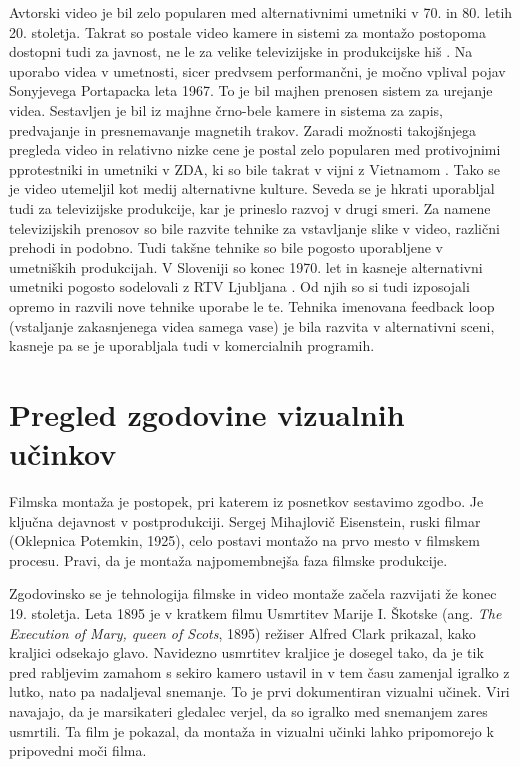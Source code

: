 \documentclass[a4paper, 12pt]{book}
\begin{document}
Avtorski video je bil zelo popularen med alternativnimi umetniki v 70. in 80. letih 20. stoletja.
Takrat so postale video kamere in sistemi za montažo postopoma dostopni tudi za javnost, ne le za velike televizijske in produkcijske hiš \cite{rekonFikc}.
Na uporabo videa v umetnosti, sicer predvsem performančni, je močno vplival pojav Sonyjevega Portapacka leta 1967.
To je bil majhen prenosen sistem za urejanje videa. 
Sestavljen je bil iz majhne črno-bele kamere in sistema za zapis, predvajanje in presnemavanje magnetih trakov.
Zaradi možnosti takojšnjega pregleda video in relativno nizke cene je postal zelo popularen med protivojnimi pprotestniki in umetniki v ZDA, ki so bile takrat v vijni z Vietnamom \cite{videosfera1}.
Tako se je video utemeljil kot medij alternativne kulture.
Seveda se je hkrati uporabljal tudi za televizijske produkcije, kar je prineslo razvoj v drugi smeri.
Za namene televizijskih prenosov so bile razvite tehnike za vstavljanje slike v video, različni prehodi in podobno.
Tudi takšne tehnike so bile pogosto uporabljene v umetniških produkcijah.
V Sloveniji so konec 1970. let in kasneje alternativni umetniki pogosto sodelovali z RTV Ljubljana \cite{tugoslavija}.
Od njih so si tudi izposojali opremo in razvili nove tehnike uporabe le te.
Tehnika imenovana feedback loop (vstaljanje zakasnjenega  videa samega vase) je bila razvita v alternativni sceni, kasneje pa se je uporabljala tudi v komercialnih programih.




\section{Pregled zgodovine vizualnih učinkov}

Filmska montaža je postopek, pri katerem iz posnetkov sestavimo zgodbo. 
Je ključna dejavnost v postprodukciji. 
Sergej Mihajlovič Eisenstein, ruski filmar (Oklepnica Potemkin, 1925), celo postavi montažo na prvo mesto v filmskem procesu.
Pravi, da je montaža najpomembnejša faza filmske produkcije. %

Zgodovinsko se je tehnologija filmske in video montaže začela razvijati že konec 19. stoletja. 
Leta 1895 je v kratkem filmu Usmrtitev Marije I. Škotske (ang. {\it The Execution of Mary, queen of Scots}, 1895) režiser Alfred Clark prikazal, kako kraljici odsekajo glavo. 
Navidezno usmrtitev kraljice je dosegel tako, da je tik pred rabljevim zamahom s sekiro kamero ustavil in v tem času zamenjal igralko z lutko, nato pa nadaljeval snemanje. 
To je prvi dokumentiran vizualni učinek. 
Viri navajajo, da je marsikateri gledalec verjel, da so igralko med snemanjem zares usmrtili. %
Ta film je pokazal, da montaža in vizualni učinki lahko pripomorejo k pripovedni moči filma.
\end{document}
